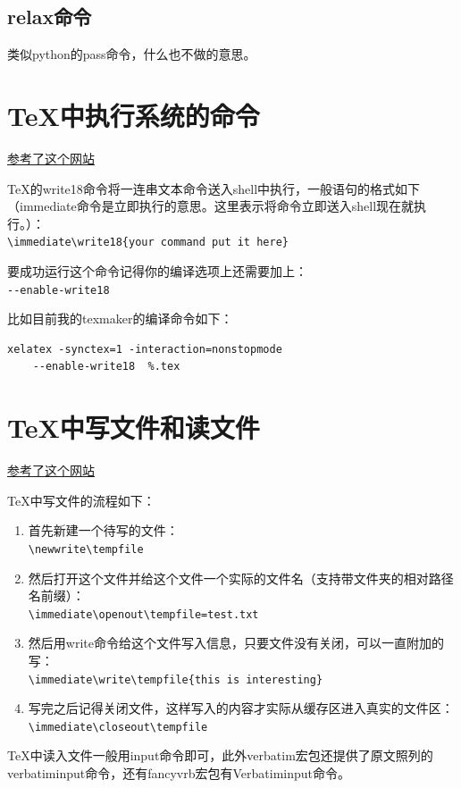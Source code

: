 \documentclass[11pt,oneside]{book}
\begin{document}
\subsection{relax命令}
类似python的pass命令，什么也不做的意思。

\section{TeX中执行系统的命令}
\href{http://tex.stackexchange.com/questions/20444/what-are-immediate-write18-and-how-does-one-use-them}{参考了这个网站}

\TeX 的write18命令将一连串文本命令送入shell中执行，一般语句的格式如下（immediate命令是立即执行的意思。这里表示将命令立即送入shell现在就执行。）：\\
\verb+\immediate\write18{your command put it here}+

要成功运行这个命令记得你的编译选项上还需要加上：\\
\verb+--enable-write18+

比如目前我的texmaker的编译命令如下：
\begin{Verbatim}
xelatex -synctex=1 -interaction=nonstopmode 
    --enable-write18  %.tex
\end{Verbatim}


\section{TeX中写文件和读文件}
\href{http://stackoverflow.com/questions/2115379/write-and-read-from-a-latex-temporary-file}{参考了这个网站}

TeX中写文件的流程如下： 
\begin{enumerate}
\item 首先新建一个待写的文件：\\
\verb+\newwrite\tempfile+
\item 然后打开这个文件并给这个文件一个实际的文件名（支持带文件夹的相对路径名前缀）：\\
\verb+\immediate\openout\tempfile=test.txt+
\item 然后用write命令给这个文件写入信息，只要文件没有关闭，可以一直附加的写：\\
\verb+\immediate\write\tempfile{this is interesting}+
\item 写完之后记得关闭文件，这样写入的内容才实际从缓存区进入真实的文件区：\\
\verb+\immediate\closeout\tempfile+
\end{enumerate}

TeX中读入文件一般用input命令即可，此外verbatim宏包还提供了原文照列的verbatiminput命令，还有fancyvrb宏包有Verbatiminput命令。
\end{document}
